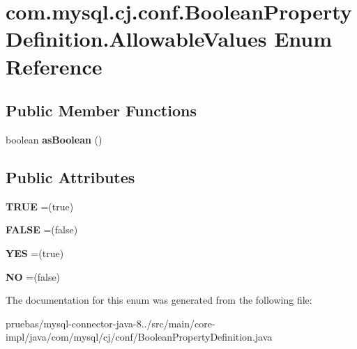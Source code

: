 \hypertarget{enumcom_1_1mysql_1_1cj_1_1conf_1_1_boolean_property_definition_1_1_allowable_values}{}\section{com.\+mysql.\+cj.\+conf.\+Boolean\+Property\+Definition.\+Allowable\+Values Enum Reference}
\label{enumcom_1_1mysql_1_1cj_1_1conf_1_1_boolean_property_definition_1_1_allowable_values}
\subsection*{Public Member Functions}
\begin{DoxyCompactItemize}
\item 
\mbox{\label{enumcom_1_1mysql_1_1cj_1_1conf_1_1_boolean_property_definition_1_1_allowable_values_adf587e39383a8e4c2a45de69aeabb887}} 
boolean {\bfseries as\+Boolean} ()
\end{DoxyCompactItemize}
\subsection*{Public Attributes}
\begin{DoxyCompactItemize}
\item 
\mbox{\label{enumcom_1_1mysql_1_1cj_1_1conf_1_1_boolean_property_definition_1_1_allowable_values_a3094d517bb204b73156e4081b512785f}} 
{\bfseries T\+R\+UE} =(true)
\item 
\mbox{\label{enumcom_1_1mysql_1_1cj_1_1conf_1_1_boolean_property_definition_1_1_allowable_values_af39e7cb5c0ef3b1f233b06911e42035c}} 
{\bfseries F\+A\+L\+SE} =(false)
\item 
\mbox{\label{enumcom_1_1mysql_1_1cj_1_1conf_1_1_boolean_property_definition_1_1_allowable_values_ae25e992a50ad9227f2a65289b477cd5a}} 
{\bfseries Y\+ES} =(true)
\item 
\mbox{\label{enumcom_1_1mysql_1_1cj_1_1conf_1_1_boolean_property_definition_1_1_allowable_values_a6fbd99656bca34e8d4dee3760653e546}} 
{\bfseries NO} =(false)
\end{DoxyCompactItemize}


The documentation for this enum was generated from the following file\+:\begin{DoxyCompactItemize}
\item 
pruebas/mysql-\/connector-\/java-\/8../src/main/core-\/impl/java/com/mysql/cj/conf/Boolean\+Property\+Definition.\+java\end{DoxyCompactItemize}
